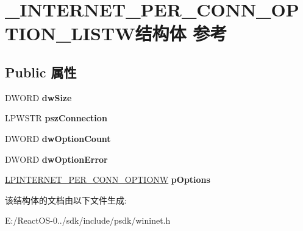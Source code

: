\hypertarget{struct___i_n_t_e_r_n_e_t___p_e_r___c_o_n_n___o_p_t_i_o_n___l_i_s_t_w}{}\section{\+\_\+\+I\+N\+T\+E\+R\+N\+E\+T\+\_\+\+P\+E\+R\+\_\+\+C\+O\+N\+N\+\_\+\+O\+P\+T\+I\+O\+N\+\_\+\+L\+I\+S\+T\+W结构体 参考}
\label{struct___i_n_t_e_r_n_e_t___p_e_r___c_o_n_n___o_p_t_i_o_n___l_i_s_t_w}
\subsection*{Public 属性}
\begin{DoxyCompactItemize}
\item 
\mbox{\label{struct___i_n_t_e_r_n_e_t___p_e_r___c_o_n_n___o_p_t_i_o_n___l_i_s_t_w_add08d3d6e7575309b765de2d55e8ccb7}} 
D\+W\+O\+RD {\bfseries dw\+Size}
\item 
\mbox{\label{struct___i_n_t_e_r_n_e_t___p_e_r___c_o_n_n___o_p_t_i_o_n___l_i_s_t_w_aa4cc3b668753d11c68fc25ab9f3134ca}} 
L\+P\+W\+S\+TR {\bfseries psz\+Connection}
\item 
\mbox{\label{struct___i_n_t_e_r_n_e_t___p_e_r___c_o_n_n___o_p_t_i_o_n___l_i_s_t_w_ab05e547425f014b634ad78e8c2a90993}} 
D\+W\+O\+RD {\bfseries dw\+Option\+Count}
\item 
\mbox{\label{struct___i_n_t_e_r_n_e_t___p_e_r___c_o_n_n___o_p_t_i_o_n___l_i_s_t_w_ad2bd8832399e592a7df122f48fa27143}} 
D\+W\+O\+RD {\bfseries dw\+Option\+Error}
\item 
\mbox{\label{struct___i_n_t_e_r_n_e_t___p_e_r___c_o_n_n___o_p_t_i_o_n___l_i_s_t_w_a62be08a043f987f2d062e5e72ec5ac4a}} 
\hyperlink{struct___i_n_t_e_r_n_e_t___p_e_r___c_o_n_n___o_p_t_i_o_n_w}{L\+P\+I\+N\+T\+E\+R\+N\+E\+T\+\_\+\+P\+E\+R\+\_\+\+C\+O\+N\+N\+\_\+\+O\+P\+T\+I\+O\+NW} {\bfseries p\+Options}
\end{DoxyCompactItemize}


该结构体的文档由以下文件生成\+:\begin{DoxyCompactItemize}
\item 
E\+:/\+React\+O\+S-\/0../sdk/include/psdk/wininet.\+h\end{DoxyCompactItemize}
